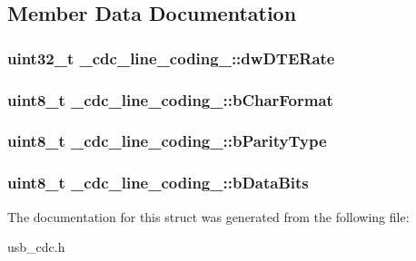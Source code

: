 \subsection{Member Data Documentation}
\hypertarget{struct__cdc__line__coding___af5653e0a5c72e957e563c9fa04e7190c}{
\subsubsection[{dw\-D\-T\-E\-Rate}]{\setlength{\rightskip}{0pt plus 5cm}uint32\-\_\-t \-\_\-cdc\-\_\-line\-\_\-coding\-\_\-\-::dw\-D\-T\-E\-Rate}}\label{struct__cdc__line__coding___af5653e0a5c72e957e563c9fa04e7190c}
\hypertarget{struct__cdc__line__coding___a381a7e4871c57edc4ea9fec514fb25ab}{
\subsubsection[{b\-Char\-Format}]{\setlength{\rightskip}{0pt plus 5cm}uint8\-\_\-t \-\_\-cdc\-\_\-line\-\_\-coding\-\_\-\-::b\-Char\-Format}}\label{struct__cdc__line__coding___a381a7e4871c57edc4ea9fec514fb25ab}
\hypertarget{struct__cdc__line__coding___a8f41fe2fe3782ce98f2547dcf11e3eb6}{
\subsubsection[{b\-Parity\-Type}]{\setlength{\rightskip}{0pt plus 5cm}uint8\-\_\-t \-\_\-cdc\-\_\-line\-\_\-coding\-\_\-\-::b\-Parity\-Type}}\label{struct__cdc__line__coding___a8f41fe2fe3782ce98f2547dcf11e3eb6}
\hypertarget{struct__cdc__line__coding___a46de2797242a70a9df4f7a09a4571bbe}{
\subsubsection[{b\-Data\-Bits}]{\setlength{\rightskip}{0pt plus 5cm}uint8\-\_\-t \-\_\-cdc\-\_\-line\-\_\-coding\-\_\-\-::b\-Data\-Bits}}\label{struct__cdc__line__coding___a46de2797242a70a9df4f7a09a4571bbe}


The documentation for this struct was generated from the following file\-:\begin{DoxyCompactItemize}
\item 
usb\-\_\-cdc.\-h\end{DoxyCompactItemize}
